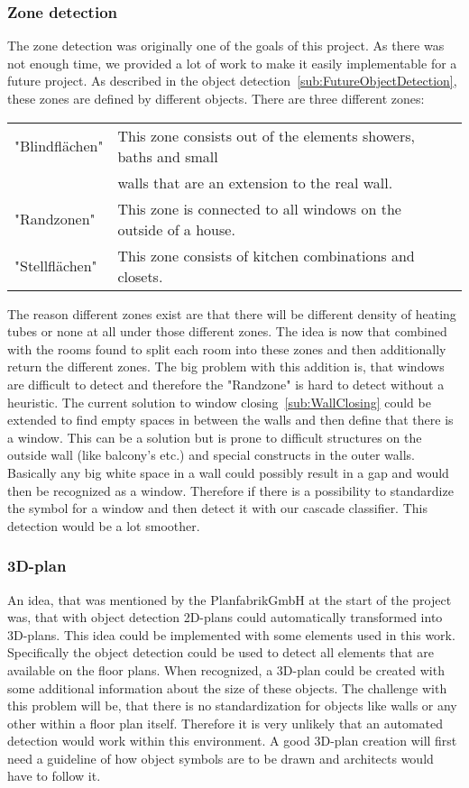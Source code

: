 \subsubsection{Zone detection}
\label{sub:ZoneDetection}
The zone detection was originally one of the goals of this project. As there was not enough time, we provided a lot of work to make it easily implementable for a future project. As described in the object detection~\ref{sub:FutureObjectDetection}, these zones are defined by different objects.
There are three different zones:
\begin{table}[h]
	\centering
	\label{tab:Zones}
	\begin{tabular}{@{}lll@{}}
		"Blindflächen" & This zone consists out of the elements showers, baths and small \\
		& walls that are an extension to the real wall.\\
		"Randzonen" &  This zone is connected to all windows on the outside of a house. \\
		"Stellflächen" & This zone consists of kitchen combinations and closets.\\
	\end{tabular}
\end{table}	

The reason different zones exist are that there will be different density of heating tubes or none at all under those different zones. The idea is now that combined with the rooms found to split each room into these zones and then additionally return the different zones. The big problem with this addition is, that windows are difficult to detect and therefore the "Randzone" is hard to detect without a heuristic. The current solution to window closing~\ref{sub:WallClosing} could be extended to find empty spaces in between the walls and then define that there is a window. This can be a solution but is prone to difficult structures on the outside wall (like balcony's etc.) and special constructs in the outer walls. Basically any big white space in a wall could possibly result in a gap and would then be recognized as a window. Therefore if there is a possibility to standardize the symbol for a window and then detect it with our cascade classifier. This detection would be a lot smoother.

\subsubsection{3D-plan}
An idea, that was mentioned by the PlanfabrikGmbH at the start of the project was, that with object detection 2D-plans could automatically transformed into 3D-plans. This idea could be implemented with some elements used in this work. Specifically the object detection could be used to detect all elements that are available on the floor plans. When recognized, a 3D-plan could be created with some additional information about the size of these objects. The challenge with this problem will be, that there is no standardization for objects like walls or any other within a floor plan itself. Therefore it is very unlikely that an automated detection would work within this environment. A good 3D-plan creation will first need a guideline of how object symbols are to be drawn and architects would have to follow it.


